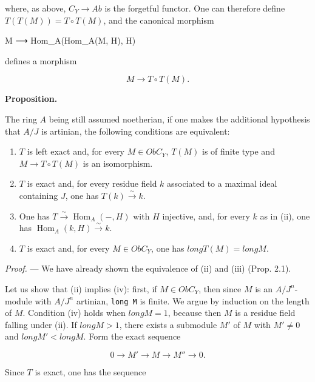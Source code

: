 \documentclass[
]{article}
\newenvironment{Shaded}{}{}
\newcommand{\NormalTok}[1]{#1}
\providecommand{\tightlist}{%
  \setlength{\itemsep}{0pt}\setlength{\parskip}{0pt}}
\begin{document}
where, as above, \(C_{Y} \to Ab\) is the forgetful functor. One can
therefore define \(T(T(M)) = T \circ T(M)\), and the canonical morphism

\begin{Shaded}
\begin{Highlighting}[]
\NormalTok{M ⟶ Hom\_A(Hom\_A(M, H), H)}
\end{Highlighting}
\end{Shaded}

defines a morphism

\[
M \longrightarrow T \circ T(M).
\]

\textbf{Proposition.}

The ring \(A\) being still assumed noetherian, if one makes the
additional hypothesis that \(A/J\) is artinian, the following conditions
are equivalent:

\begin{enumerate}
\def\labelenumi{\arabic{enumi}.}
\tightlist
\item
  \(T\) is left exact and, for every \(M \in Ob C_{Y}\), \(T(M)\) is of
  finite type and \(M \to T \circ T(M)\) is an isomorphism.
\item
  \(T\) is exact and, for every residue field \(k\) associated to a
  maximal ideal containing \(J\), one has \(T(k) \xrightarrow{\sim} k\).
\item
  One has \(T \xrightarrow{\sim} \operatorname{Hom}_{A}(-, H)\) with
  \(H\) injective, and, for every \(k\) as in (ii), one has
  \(\operatorname{Hom}_{A}(k, H) \xrightarrow{\sim} k\).
\item
  \(T\) is exact and, for every \(M \in Ob C_{Y}\), one has
  \(long T(M) = long M\).
\end{enumerate}

\emph{Proof.} --- We have already shown the equivalence of (ii) and
(iii) (Prop. 2.1).

Let us show that (ii) implies (iv): first, if \(M \in Ob C_{Y}\), then
since \(M\) is an \(A/J^{n}\)-module with \(A/J^{n}\) artinian,
\texttt{long\ M} is finite. We argue by induction on the length of
\(M\). Condition (iv) holds when \(long M = 1\), because then \(M\) is a
residue field falling under (ii). If \(long M > 1\), there exists a
submodule \(M'\) of \(M\) with \(M' \neq 0\) and \(long M' < long M\).
Form the exact sequence

\[
0 \longrightarrow M' \longrightarrow M \longrightarrow M'' \longrightarrow 0.
\]

Since \(T\) is exact, one has the sequence
\end{document}

